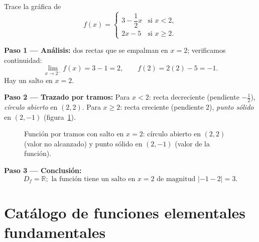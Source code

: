 \begin{example}
Trace la gráfica de
\[
  f(x) = \begin{cases} 3 - \dfrac{1}{2}x & \text{si } x < 2, \\ 2x - 5 & \text{si } x \geq 2. \end{cases}
\]

\begin{myproof}
\textbf{Paso 1 — Análisis:} dos rectas que se empalman en $x=2$; verificamos continuidad:
\[
  \lim_{x\to 2^-} f(x) = 3 - 1 = 2, \qquad f(2) = 2(2)-5 = -1.
\]
Hay un salto en $x = 2$.

\textbf{Paso 2 — Trazado por tramos:} Para $x < 2$: recta decreciente (pendiente $-\tfrac{1}{2}$), \emph{círculo abierto} en $(2, 2)$. Para $x \geq 2$: recta creciente (pendiente $2$), \emph{punto sólido} en $(2,-1)$ (figura~\ref{fig:tramos_salto}).

\begin{figure}[H]
\centering
{}
\caption{Función por tramos con salto en $x=2$: círculo abierto en $(2,2)$ (valor no alcanzado) y punto sólido en $(2,-1)$ (valor de la función).}
\label{fig:tramos_salto}
\end{figure}

\textbf{Paso 3 — Conclusión:}
\[
  \boxed{D_f = \mathbb{R}; \text{ la función tiene un salto en } x = 2 \text{ de magnitud } |{-1} - 2| = 3.}
\]
\end{myproof}
\end{example}

\section{Catálogo de funciones elementales fundamentales}

